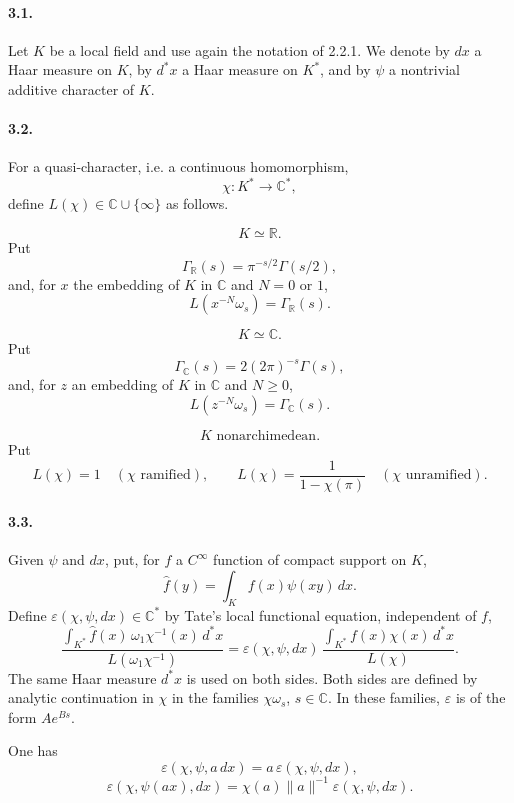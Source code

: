 \documentclass[10pt]{article}
\newcommand{\C}{\mathbb C}
\providecommand{\R}{\mathbb R}
\begin{document}
\paragraph{3.1.} Let \(K\) be a local field and use again the notation of 2.2.1. We denote by \(dx\) a Haar measure on \(K\), by \(d^*x\) a Haar measure on \(K^*\), and by \(\psi\) a nontrivial additive character of \(K\).

\paragraph{3.2.} For a quasi-character, i.e. a continuous homomorphism,
\[
\chi:K^*\longrightarrow\C^*,
\]
define \(L(\chi)\in\C\cup\{\infty\}\) as follows.

\[
\tag{3.2.1}
K\simeq\R.
\]
Put
\[
\Gamma_\R(s)=\pi^{-s/2}\Gamma(s/2),
\]
and, for \(x\) the embedding of \(K\) in \(\C\) and \(N=0\) or \(1\),
\[
L(x^{-N}\omega_s)=\Gamma_\R(s).
\]

\[
\tag{3.2.2}
K\simeq\C.
\]
Put
\[
\Gamma_\C(s)=2(2\pi)^{-s}\Gamma(s),
\]
and, for \(z\) an embedding of \(K\) in \(\C\) and \(N\ge0\),
\[
L(z^{-N}\omega_s)=\Gamma_\C(s).
\]

\[
\tag{3.2.3}
K\text{ nonarchimedean.}
\]
Put
\[
L(\chi)=1\quad(\chi\text{ ramified}),
\qquad
L(\chi)=\frac1{1-\chi(\pi)}\quad(\chi\text{ unramified}).
\]

\paragraph{3.3.} Given \(\psi\) and \(dx\), put, for \(f\) a \(C^\infty\) function of compact support on \(K\),
\[
\widehat f(y)=\int_K f(x)\psi(xy)\,dx.
\]
Define \(\varepsilon(\chi,\psi,dx)\in\C^*\) by Tate's local functional equation, independent of \(f\),
\[
\tag{3.3.1}
\frac{\displaystyle\int_{K^*}\widehat f(x)\,\omega_1\chi^{-1}(x)\,d^*x}
     {L(\omega_1\chi^{-1})}
=
\varepsilon(\chi,\psi,dx)\,
\frac{\displaystyle\int_{K^*}f(x)\chi(x)\,d^*x}
     {L(\chi)}.
\]
The same Haar measure \(d^*x\) is used on both sides. Both sides are defined by analytic continuation in \(\chi\) in the families \(\chi\omega_s\), \(s\in\C\). In these families, \(\varepsilon\) is of the form \(Ae^{Bs}\).

One has
\[
\tag{3.3.2}
\varepsilon(\chi,\psi,a\,dx)=a\,\varepsilon(\chi,\psi,dx),
\]
\[
\tag{3.3.3}
\varepsilon(\chi,\psi(ax),dx)=\chi(a)\|a\|^{-1}\varepsilon(\chi,\psi,dx).
\]
\end{document}
